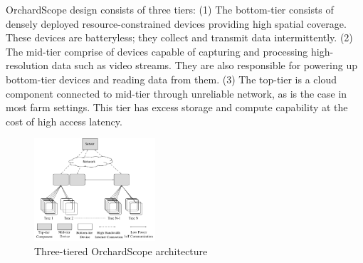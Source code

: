 
OrchardScope design consists of three tiers: (1) The bottom-tier consists of densely deployed resource-constrained devices providing high spatial coverage. These devices are batteryless; they collect and transmit data intermittently. (2) The mid-tier comprise of devices capable of capturing and processing high-resolution data such as video streams. They are also responsible for powering up bottom-tier devices and reading data from them. (3) The top-tier is a cloud component connected to mid-tier through unreliable network, as is the case in most farm settings. This tier has excess storage and compute capability at the cost of high access latency.

\begin{figure}[t]
\centering
\includegraphics[width=0.4\textwidth]{./figures/arch_v2.pdf}
\caption{Three-tiered OrchardScope architecture}
\label{fig:architecture}
\end{figure}


